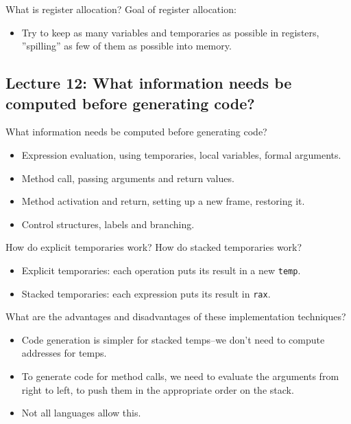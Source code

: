 \documentclass[11pt]{beamer}
\begin{document}
\begin{frame}
\begin{block}{What is register allocation?}
Goal of register allocation: 
\begin{itemize}
\item Try to keep as many variables and temporaries as possible in registers, ”spilling” as few of them as possible into memory.
\end{itemize}

\end{block}

\end{frame}

\subsection{Lecture 12: What information needs be computed before generating code?}
\begin{frame}
\begin{block}{What information needs be computed before generating code?}
\begin{itemize}
\item Expression evaluation, using temporaries, local variables, formal arguments.
\item Method call, passing arguments and return values.
\item Method activation and return, setting up a new frame, restoring it.
\item Control structures, labels and branching.
\end{itemize}
\end{block}

\begin{block}{How do explicit temporaries work? How do stacked temporaries work? }
\begin{itemize}
\item Explicit temporaries: each operation puts its result in a new \texttt{temp}.
\item Stacked temporaries: each expression puts its result in \texttt{rax}.
\end{itemize}
\end{block}

\end{frame}

\begin{frame}
\begin{block}{What are the advantages and disadvantages of these implementation techniques? }
\begin{itemize}
\item Code generation is simpler for stacked temps–we don’t need to compute addresses for temps.
\item To generate code for method calls, we need to evaluate the arguments from right to left, to push them in the appropriate order on the stack.
\item Not all languages allow this.
\end{itemize}
\end{block}
\end{frame}
\end{document}
